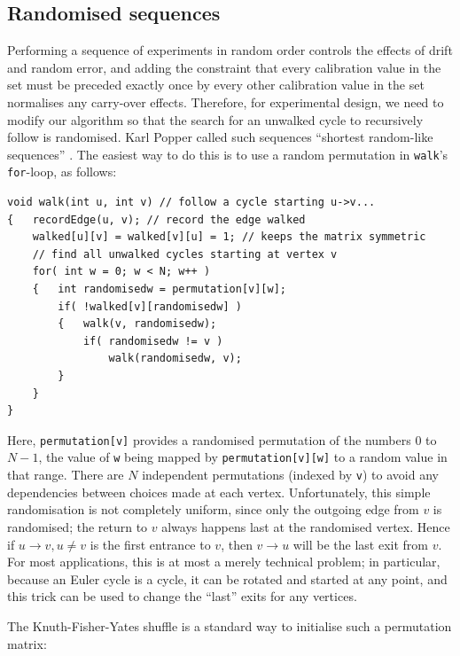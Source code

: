 \documentclass[12pt]{article}
\begin{document}
\subsection{Randomised sequences}\label{randomise}

Performing a sequence of experiments in random order controls the effects of drift and random error, and adding the constraint that every calibration value in the set must be preceded exactly once by every other calibration value in the set normalises any carry-over effects. Therefore, for experimental design, we need to modify our algorithm so that the search for an unwalked cycle to recursively follow is randomised. Karl Popper called such sequences ``shortest random-like sequences'' \cite{popper}. The easiest way to do this is to use a random permutation in \texttt{walk}'s \texttt{for}-loop, as follows:

\begin{verbatim}
void walk(int u, int v) // follow a cycle starting u->v...
{   recordEdge(u, v); // record the edge walked
    walked[u][v] = walked[v][u] = 1; // keeps the matrix symmetric
    // find all unwalked cycles starting at vertex v
    for( int w = 0; w < N; w++ )
    {   int randomisedw = permutation[v][w];
        if( !walked[v][randomisedw] )
        {   walk(v, randomisedw);
            if( randomisedw != v )
                walk(randomisedw, v);
        }
    }
}
\end{verbatim}

Here, \texttt{permutation[v]} provides a randomised permutation of the numbers $0$ to $N-1$, the value of \texttt{w} being mapped by \texttt{permutation[v][w]} to a random value in that range. 
There are $N$ independent permutations (indexed by \texttt{v}) to avoid any dependencies between choices made at each vertex.  Unfortunately, this simple randomisation is not completely uniform, since only the outgoing edge from $v$ is randomised; the return to $v$ always happens last at the randomised vertex. Hence if $u\rightarrow v, u \neq v$ is the first entrance to $v$, then $v \rightarrow u$ will be the last exit from $v$. For most applications, this is at most a merely technical problem; in particular, because an Euler cycle is a cycle, it can be rotated and started at any point, and this trick can be used to change the ``last'' exits for any vertices.

The Knuth-Fisher-Yates shuffle \cite[p145--146]{knuth2} is a standard way to initialise such a permutation matrix:
\end{document}
